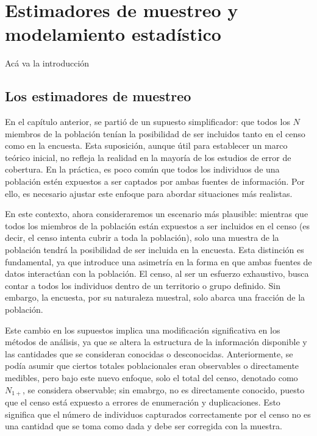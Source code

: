 \documentclass[
  12pt,
]{book}
\begin{document}
\chapter{Estimadores de muestreo y modelamiento estadístico}\label{cap6}

Acá va la introducción

\section{Los estimadores de muestreo}\label{los-estimadores-de-muestreo}

En el capítulo anterior, se partió de un supuesto simplificador: que todos los \(N\) miembros de la población tenían la posibilidad de ser incluidos tanto en el censo como en la encuesta. Esta suposición, aunque útil para establecer un marco teórico inicial, no refleja la realidad en la mayoría de los estudios de error de cobertura. En la práctica, es poco común que todos los individuos de una población estén expuestos a ser captados por ambas fuentes de información. Por ello, es necesario ajustar este enfoque para abordar situaciones más realistas.

En este contexto, ahora consideraremos un escenario más plausible: mientras que todos los miembros de la población están expuestos a ser incluidos en el censo (es decir, el censo intenta cubrir a toda la población), solo una muestra de la población tendrá la posibilidad de ser incluida en la encuesta. Esta distinción es fundamental, ya que introduce una asimetría en la forma en que ambas fuentes de datos interactúan con la población. El censo, al ser un esfuerzo exhaustivo, busca contar a todos los individuos dentro de un territorio o grupo definido. Sin embargo, la encuesta, por su naturaleza muestral, solo abarca una fracción de la población.

Este cambio en los supuestos implica una modificación significativa en los métodos de análisis, ya que se altera la estructura de la información disponible y las cantidades que se consideran conocidas o desconocidas. Anteriormente, se podía asumir que ciertos totales poblacionales eran observables o directamente medibles, pero bajo este nuevo enfoque, solo el total del censo, denotado como \(N_{1+}\), se considera observable; sin emabrgo, no es directamente conocido, puesto que el censo está expuesto a errores de enumeración y duplicaciones. Esto significa que el número de individuos capturados correctamente por el censo no es una cantidad que se toma como dada y debe ser corregida con la muestra.
\end{document}
